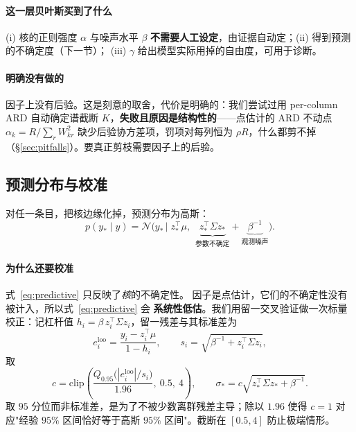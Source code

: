 \documentclass[11pt,a4paper]{article}
\begin{document}
\paragraph{这一层贝叶斯买到了什么} (i) 核的正则强度 $\alpha$ 与噪声水平 $\beta$
\textbf{不需要人工设定}，由证据自动定；(ii) 得到预测的不确定度（下一节）；
(iii) $\gamma$ 给出模型实际用掉的自由度，可用于诊断。

\paragraph{明确没有做的} 因子上没有后验。这是刻意的取舍，代价是明确的：我们尝试过用
per-column ARD 自动确定谱截断 $K$，\textbf{失败且原因是结构性的}——点估计的 ARD 不动点
$\alpha_k=R/\sum_rW_{kr}^2$ 缺少后验协方差项，罚项对每列恒为 $\rho R$，什么都剪不掉
（\S\ref{sec:pitfalls}）。要真正剪枝需要因子上的后验。

\subsection{预测分布与校准}
\label{sec:predict}

对任一条目，把核边缘化掉，预测分布为高斯：
\begin{equation}
p(y_*\mid y)=\mathcal N\!\Big(y_* \,\Big|\; z_*^\top\mu,\ \
\underbrace{z_*^\top\Sigma z_*}_{\text{参数不确定}}
+\underbrace{\beta^{-1}}_{\text{观测噪声}}\Big).
\label{eq:predictive}
\end{equation}

\paragraph{为什么还要校准} 式~\eqref{eq:predictive} 只反映了\emph{核}的不确定性。
因子是点估计，它们的不确定性没有被计入，所以式~\eqref{eq:predictive} 会
\textbf{系统性低估}。我们用留一交叉验证做一次标量校正：记杠杆值
$h_i=\beta\,z_i^\top\Sigma z_i$，留一残差与其标准差为
\begin{equation}
e_i^{\mathrm{loo}}=\frac{y_i-z_i^\top\mu}{1-h_i},
\qquad
s_i=\sqrt{\beta^{-1}+z_i^\top\Sigma z_i},
\end{equation}
取
\begin{equation}
c=\mathrm{clip}\!\left(\frac{Q_{0.95}\big(|e^{\mathrm{loo}}_i|/s_i\big)}{1.96},
\ 0.5,\ 4\right),
\qquad
\sigma_*=c\sqrt{z_*^\top\Sigma z_*+\beta^{-1}} .
\label{eq:calibration}
\end{equation}
取 $95$ 分位而非标准差，是为了不被少数离群残差主导；除以 $1.96$ 使得
$c=1$ 对应"经验 $95\%$ 区间恰好等于高斯 $95\%$ 区间"。截断在 $[0.5,4]$ 防止极端情形。
\end{document}
